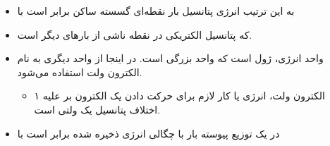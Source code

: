 \begin{ELjoin}

\begin{itemize}
\tightlist
\item
  به این ترتیب انرژی پتانسیل  بار نقطه‌ای گسسته ساکن برابر است با
\end{itemize}

\begin{ELimportant}{}


\end{ELimportant}

\end{ELjoin}

\begin{ELunit}

\begin{itemize}
\tightlist
\item
  که  پتانسیل الکتریکی در نقطه  ناشی از بارهای دیگر است.
\item
  واحد  انرژی، ژول است که واحد بزرگی است. در اینجا از واحد دیگری به نام الکترون ولت  استفاده می‌شود.

  \begin{itemize}
  \tightlist
  \item
    ۱ الکترون ولت، انرژی یا کار لازم برای حرکت دادن یک الکترون بر علیه اختلاف پتانسیل یک ولتی است.
  \end{itemize}
\end{itemize}


\end{ELunit}

\begin{ELjoin}

\begin{itemize}
\tightlist
\item
  در یک توزیع پیوسته بار با چگالی \ELim{\rho} انرژی ذخیره شده برابر است با
\end{itemize}

\begin{ELimportant}{}


\end{ELimportant}

\end{ELjoin}

